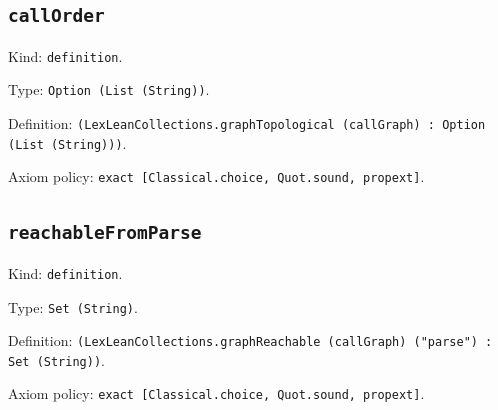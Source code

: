 \documentclass[11pt]{article}
\begin{document}
\subsection*{\texttt{callOrder}}
\noindent Kind: \texttt{definition}.\par
\noindent Type: \texttt{Option (List (String))}.\par
\noindent Definition: \texttt{(LexLeanCollections.graphTopological (callGraph) : Option (List (String)))}.\par
\noindent Axiom policy: \texttt{exact [Classical.choice, Quot.sound, propext]}.\par
\subsection*{\texttt{reachableFromParse}}
\noindent Kind: \texttt{definition}.\par
\noindent Type: \texttt{Set (String)}.\par
\noindent Definition: \texttt{(LexLeanCollections.graphReachable (callGraph) ("parse") : Set (String))}.\par
\noindent Axiom policy: \texttt{exact [Classical.choice, Quot.sound, propext]}.\par
\end{document}
